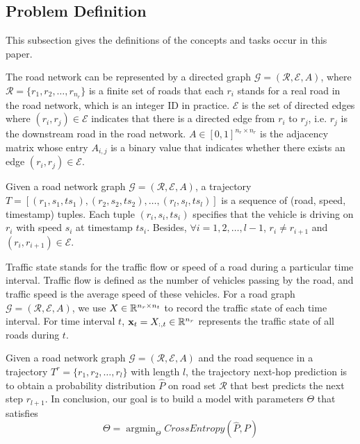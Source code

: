 \subsection{Problem Definition}
This subsection gives the definitions\cite{AAAI21} of the concepts and tasks occur in this paper.
\begin{definition}
    The road network can be represented by a directed graph $\mathcal{G}=(\mathcal{R}, \mathcal{E}, A)$, where $\mathcal{R}=\{r_1, r_2, \dots, r_{n_r}\}$ is a finite set of roads that each $r_i$ stands for a real road in the road network, which is an integer ID in practice. $\mathcal{E}$ is the set of directed edges where $(r_i, r_j)\in \mathcal{E}$ indicates that there is a directed edge from $r_i$ to $r_j$, i.e. $r_j$ is the downstream road in the road network. $A \in [0, 1]^{n_r\times n_r}$ is the adjacency matrix whose entry $A_{i, j}$ is a binary value that indicates whether there exists an edge $(r_i, r_j)\in\mathcal{E}$.
\end{definition}

\begin{definition}[Trajectory]
    Given a road network graph $\mathcal{G}=(\mathcal{R}, \mathcal{E}, A)$, a trajectory $T=[(r_1, s_1, ts_1), (r_2, s_2, ts_2), \dots, (r_l, s_l, ts_l)]$ is a sequence of (road, speed, timestamp) tuples. Each tuple $(r_i, s_i, ts_i)$ specifies that the vehicle is driving on $r_i$ with speed $s_i$ at timestamp $ts_i$. Besides, $\forall i=1, 2, \dots, l-1$, $r_i\neq r_{i+1}$ and $(r_i, r_{i+1})\in\mathcal{E}$.
\end{definition}

\begin{definition}
    Traffic state stands for the traffic flow or speed of a road during a particular time interval. Traffic flow is defined as the number of vehicles passing by the road, and traffic speed is the average speed of these vehicles. For a road graph $\mathcal{G}=(\mathcal{R}, \mathcal{E}, A)$, we use $X\in\mathbb{R}^{n_r\times n_t}$ to record the traffic state of each time interval. For time interval $t$, $\mathbf{x}_t=X_{:, t}\in\mathbb{R}^{n_r}$ represents the traffic state of all roads during $t$.
\end{definition}

\begin{problem}
    Given a road network graph $\mathcal{G}=(\mathcal{R}, \mathcal{E}, A)$ and the road sequence in a trajectory $T^r=\{r_1, r_2, \dots, r_l \}$ with length $l$, the trajectory next-hop prediction is to obtain a probability distribution $\hat P$ on road set $\mathcal{R}$ that best predicts the next step $r_{l+1}$. In conclusion, our goal is to build a model with parameters $\Theta$ that satisfies
    \begin{equation}
        \Theta=\mathop{\arg\min}_\Theta CrossEntropy(\hat P, P)
    \end{equation}
\end{problem}

